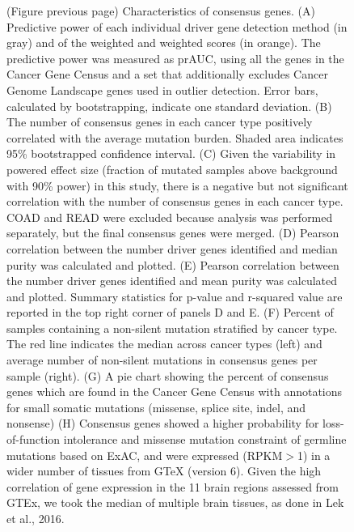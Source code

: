 \begin{figure} [t!]
\caption[(continued) Characteristics of consensus genes.]{(Figure previous page) Characteristics of consensus genes. (A) Predictive power of each individual driver gene detection method (in gray) and of the weighted and weighted scores (in orange). The predictive power was measured as prAUC, using all the genes in the Cancer Gene Census and a set that additionally excludes Cancer Genome Landscape genes used in outlier detection. Error bars, calculated by bootstrapping, indicate one standard deviation. (B) The number of consensus genes in each cancer type positively correlated with the average mutation burden. Shaded area indicates 95\% bootstrapped confidence interval. (C) Given the variability in powered effect size (fraction of mutated samples above background with 90\% power) in this study, there is a negative but not significant correlation with the number of consensus genes in each cancer type. COAD and READ were excluded because analysis was performed separately, but the final consensus genes were merged. (D) Pearson correlation between the number driver genes identified and median purity was calculated and plotted. (E) Pearson correlation between the number driver genes identified and mean purity was calculated and plotted. Summary statistics for p-value and r-squared value are reported in the top right corner of panels D and E. (F) Percent of samples containing a non-silent mutation stratified by cancer type. The red line indicates the median across cancer types (left) and average number of non-silent mutations in consensus genes per sample (right). (G) A pie chart showing the percent of consensus genes which are found in the Cancer Gene Census with annotations for small somatic mutations (missense, splice site, indel, and nonsense) (H) Consensus genes showed a higher probability for loss-of-function intolerance and missense mutation constraint of germline mutations based on ExAC, and were expressed (RPKM$>$1) in a wider number of tissues from GTeX (version 6). Given the high correlation of gene expression in the 11 brain regions assessed from GTEx, we took the median of multiple brain tissues, as done in Lek et al., 2016.}
\end{figure}

